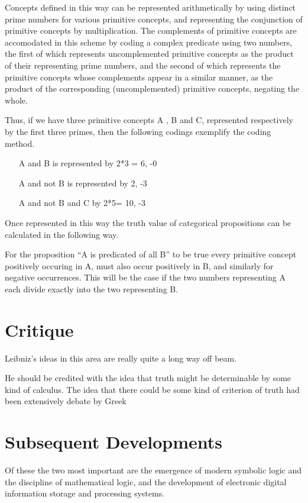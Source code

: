 Concepts defined in this way can be represented arithmetically by using distinct prime numbers for
various primitive concepts, and representing the conjunction of primitive concepts by multiplication.
The complements of primitive concepts are accomodated in this scheme by coding a complex predicate
using two numbers, the first of which represents uncomplemented primitive concepts as the product of
their representing prime numbers, and the second of which represents the primitive concepts whose
complements appear in a similar manner, as the product of the corresponding (uncomplemented) primitive
concepts, negating the whole.

Thus, if we have three primitive concepts A , B and C, represented respectively by
the first three primes, then the following codings exemplify  the coding method.

\begin{itemize}
\item[A and B] is represented by 2*3 = 6, -0
\item[A and not B] is represented by 2, -3
\item[A and not B and C] by 2*5= 10, -3
\end{itemize}

Once represented in this way the truth value of categorical
propositions can be calculated in the following way.

For the proposition ``A is predicated of all B'' to be true every primitive concept
positively occuring in A, must also occur positively in B, and similarly for negative
occurrences.
This will be the case if the two numbers representing A each divide exactly into the two
representing B.

\section{Critique}

Leibniz's ideas in this area are really quite a long way off beam.

He should be credited with the idea that truth might be determinable by some kind of calculus.
The idea that there could be some kind of criterion of truth had been extensively debate by Greek 

\section{Subsequent Developments}

Of these the two most important are the emergence of modern symbolic logic and the discipline of
mathematical logic, and the development of electronic digital information storage and processing
systems.

